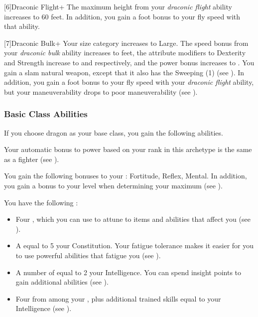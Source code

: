             [6]{Draconic Flight+} The maximum height from your \textit{draconic flight} ability increases to 60 feet.
            In addition, you gain a  foot bonus to your fly speed with that ability.

            [7]{Draconic Bulk+} Your size category increases to Large.
            The speed bonus from your \textit{draconic bulk} ability increases to  feet, the attribute modifiers to Dexterity and Strength increase to  and  respectively, and the power bonus increases to .
            You gain a slam natural weapon, except that it also has the Sweeping (1)  (see ).
            In addition, you gain a  foot bonus to your fly speed with your \textit{draconic flight} ability, but your maneuverability drops to poor maneuverability (see ).

        \subsubsection{Basic Class Abilities}
            If you choose dragon as your base class, you gain the following abilities.

             Your automatic bonus to power based on your rank in this archetype is the same as a fighter (see ).

            You gain the following bonuses to your :  Fortitude,  Reflex,  Mental.
            In addition, you gain a  bonus to your level when determining your maximum  (see ).

             You have the following :
            \begin{itemize}
                \item Four , which you can use to attune to items and abilities that affect you (see ).
                \item A  equal to 5 \add your Constitution.
                    Your fatigue tolerance makes it easier for you to use powerful abilities that fatigue you (see ).
                \item A number of  equal to 2 \add your Intelligence.
                    You can spend insight points to gain additional abilities (see ).
                \item Four  from among your , plus additional trained skills equal to your Intelligence (see ).
            \end{itemize}

